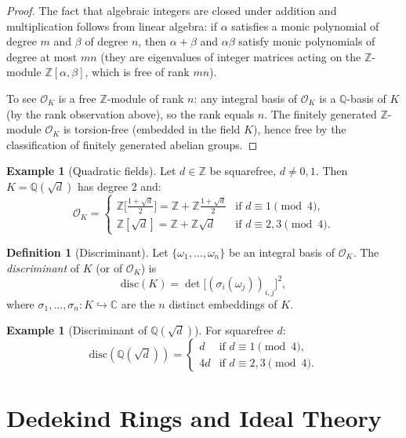 \documentclass[12pt,a4paper]{amsart}
\theoremstyle{definition}
\newtheorem{definition}[theorem]{Definition}
\newtheorem{example}[theorem]{Example}
\newcommand{\Z}{\mathbb{Z}}
\newcommand{\Q}{\mathbb{Q}}
\newcommand{\C}{\mathbb{C}}
\newcommand{\OK}{\mathcal{O}_K}
\newcommand{\disc}{\mathrm{disc}}
\begin{document}
\begin{proof}
The fact that algebraic integers are closed under addition and multiplication
follows from linear algebra: if $\alpha$ satisfies a monic polynomial of
degree $m$ and $\beta$ of degree $n$, then $\alpha + \beta$ and $\alpha\beta$
satisfy monic polynomials of degree at most $mn$ (they are eigenvalues of
integer matrices acting on the $\Z$-module $\Z[\alpha,\beta]$, which is
free of rank $mn$).

To see $\OK$ is a free $\Z$-module of rank $n$: any integral basis of $\OK$
is a $\Q$-basis of $K$ (by the rank observation above), so the rank equals
$n$.  The finitely generated $\Z$-module $\OK$ is torsion-free (embedded
in the field $K$), hence free by the classification of finitely generated
abelian groups.
\end{proof}

\begin{example}[Quadratic fields]
\label{ex:quadratic}
Let $d \in \Z$ be squarefree, $d \ne 0, 1$.  Then $K = \Q(\sqrt{d})$
has degree $2$ and:
\[
  \OK =
  \begin{cases}
    \Z\bigl[\tfrac{1+\sqrt{d}}{2}\bigr] = \Z + \Z\tfrac{1+\sqrt{d}}{2}
    & \text{if } d \equiv 1 \pmod{4}, \\[4pt]
    \Z[\sqrt{d}] = \Z + \Z\sqrt{d}
    & \text{if } d \equiv 2, 3 \pmod{4}.
  \end{cases}
\]
\end{example}

\begin{definition}[Discriminant]
\label{def:disc}
Let $\{\omega_1, \ldots, \omega_n\}$ be an integral basis of $\OK$.
The \emph{discriminant} of $K$ (or of $\OK$) is
\[
  \disc(K) = \det\bigl[(\sigma_i(\omega_j))_{i,j}\bigr]^2,
\]
where $\sigma_1, \ldots, \sigma_n : K \hookrightarrow \C$ are the $n$
distinct embeddings of $K$.
\end{definition}

\begin{example}[Discriminant of $\Q(\sqrt{d})$]
For squarefree $d$:
\[
  \disc(\Q(\sqrt{d})) =
  \begin{cases}
    d & \text{if } d \equiv 1 \pmod{4}, \\
    4d & \text{if } d \equiv 2, 3 \pmod{4}.
  \end{cases}
\]
\end{example}

\section{Dedekind Rings and Ideal Theory}
\end{document}
